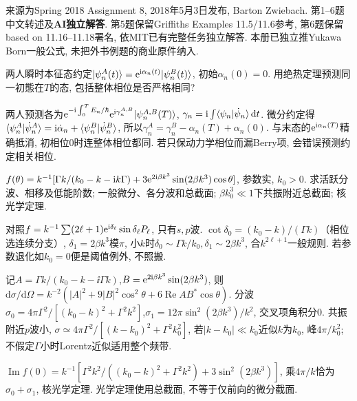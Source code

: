来源为Spring 2018 Assignment 8, 2018年5月3日发布, Barton Zwiebach. 第1--6题中文转述及\textbf{AI独立解答}. 第5题保留Griffiths Examples 11.5/11.6参考, 第6题保留based on 11.16--11.18署名, 依MIT已有完整任务独立解答. 本册已独立推Yukawa Born一般公式, 未把外书例题的商业原件纳入.
\begin{exercise}
两人瞬时本征态约定$\lvert \psi_n^A(t)\rangle=\mathrm e^{\mathrm i\alpha_n(t)}\lvert \psi_n^B(t)\rangle$, 初始$\alpha_n(0)=0$. 用绝热定理预测同一初態在$T$的态, 包括整体相位是否严格相同?
\end{exercise}
\begin{solution}
两人预测各为$\mathrm e^{-\mathrm i\int_0^TE_n/\hbar}\mathrm e^{\mathrm i\gamma_n^{A,B}}\lvert \psi_n^{A,B}(T)\rangle$, $\gamma_n=\mathrm i\int\langle \psi_n\vert \dot\psi_n\rangle\,\mathrm d t$. 微分约定得$\langle \psi_n^A\vert \dot\psi_n^A\rangle=\mathrm i\dot\alpha_n+\langle \psi_n^B\vert \dot\psi_n^B\rangle$, 所以$\gamma_n^A=\gamma_n^B-\alpha_n(T)+\alpha_n(0)$. 与末态的$\mathrm e^{\mathrm i\alpha_n(T)}$精确抵消, 初相位0时连整体相位都同. 若只保动力学相位而漏Berry项, 会错误预测约定相关相位.
\end{solution}
\begin{exercise}
$ f(\theta)=k^{-1}[\Gamma k/(k_0-k-\mathrm i k\Gamma)+3\mathrm e^{2\mathrm i\beta k^3}\sin(2\beta k^3)\cos\theta]$, 参数实, $k_0>0$. 求活跃分波、相移及低能阶数; 一般微分、各分波和总截面; $\beta k_0^3\ll1$下共振附近总截面; 核光学定理.
\end{exercise}
\begin{solution}
对照$f=k^{-1}\sum(2\ell+1)\mathrm e^{\mathrm i\delta_\ell}\sin\delta_\ell P_\ell$, 只有$s,p$波. $\cot\delta_0=(k_0-k)/(\Gamma k)$（相位选连续分支）, $\delta_1=2\beta k^3$模$\pi$, 小$k$时$\delta_0\sim\Gamma k/k_0,\delta_1\sim2\beta k^3$, 合$k^{2\ell+1}$一般规则. 若参数退化如$k_0=0$便是阈值例外, 不照搬.

记$A=\Gamma k/(k_0-k-\ii\Gamma k)$,$B=\mathrm e^{2\mathrm i\beta k^3}\sin(2\beta k^3)$, 则$\mathrm d\sigma/\mathrm d\Omega=k^{-2}(|A|^2+9|B|^2\cos^2\theta+6\operatorname{Re}AB^*\cos\theta)$. 分波$\sigma_0=4\pi\Gamma^2/[(k_0-k)^2+\Gamma^2k^2]$,$\sigma_1=12\pi\sin^2(2\beta k^3)/k^2$, 交叉项角积分0. 共振附近$p$波小, $\sigma\simeq4\pi\Gamma^2/[(k-k_0)^2+\Gamma^2k_0^2]$, 若$|k-k_0|\ll k_0$近似$k$为$k_0$, 峰$4\pi/k_0^2$; 不假定$\Gamma$小时Lorentz近似适用整个频带.

$\operatorname{Im}f(0)=k^{-1}[\Gamma^2k^2/((k_0-k)^2+\Gamma^2k^2)+3\sin^2(2\beta k^3)]$, 乘$4\pi/k$恰为$\sigma_0+\sigma_1$, 核光学定理. 光学定理使用总截面, 不等于仅前向的微分截面.
\end{solution}
